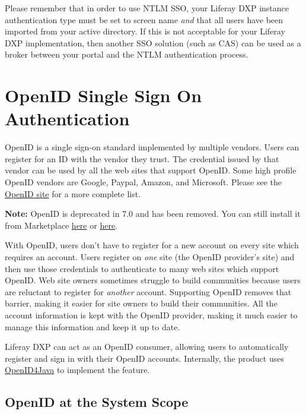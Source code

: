 Please remember that in order to use NTLM SSO, your Liferay DXP instance
authentication type must be set to screen name \emph{and} that all users
have been imported from your active directory. If this is not acceptable
for your Liferay DXP implementation, then another SSO solution (such as
CAS) can be used as a broker between your portal and the NTLM
authentication process.

\chapter{OpenID Single Sign On
Authentication}\label{openid-single-sign-on-authentication}

OpenID is a single sign-on standard implemented by multiple vendors.
Users can register for an ID with the vendor they trust. The credential
issued by that vendor can be used by all the web sites that support
OpenID. Some high profile OpenID vendors are Google, Paypal, Amazon, and
Microsoft. Please see the \href{http://www.openid.net/}{OpenID site} for
a more complete list.

\noindent\hrulefill

\textbf{Note:} OpenID is deprecated in 7.0 and has been removed. You can
still install it from Marketplace
\href{https://web.liferay.com/marketplace/-/mp/application/125668346}{here}
or
\href{https://web.liferay.com/marketplace/-/mp/application/125668379}{here}.

\noindent\hrulefill

With OpenID, users don't have to register for a new account on every
site which requires an account. Users register on \emph{one} site (the
OpenID provider's site) and then use those credentials to authenticate
to many web sites which support OpenID. Web site owners sometimes
struggle to build communities because users are reluctant to register
for \emph{another} account. Supporting OpenID removes that barrier,
making it easier for site owners to build their communities. All the
account information is kept with the OpenID provider, making it much
easier to manage this information and keep it up to date.

Liferay DXP can act as an OpenID consumer, allowing users to
automatically register and sign in with their OpenID accounts.
Internally, the product uses
\href{https://github.com/jbufu/openid4java}{OpenID4Java} to implement
the feature.

\section{OpenID at the System Scope}\label{openid-at-the-system-scope}

